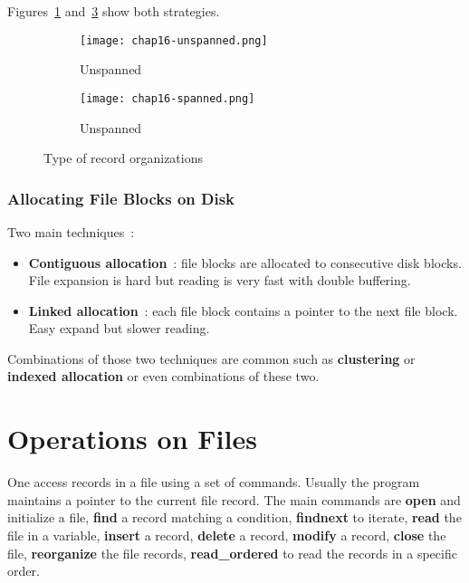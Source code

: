 Figures~\ref{fig:chap16-unspanned} and~\ref{fig:chap16-spanned} show both strategies.

\begin{figure}[h]
    \centering
    \begin{subfigure}[b]{\linewidth}
        \centering
        \texttt{[image: chap16-unspanned.png]}
        \caption{Unspanned}
        \label{fig:chap16-unspanned}
    \end{subfigure}
    
    \begin{subfigure}[b]{\linewidth}
        \centering
        \texttt{[image: chap16-spanned.png]}
        \caption{Unspanned}
        \label{fig:chap16-spanned}
    \end{subfigure}
    \caption{Type of record organizations}
\end{figure}


\subsubsection*{Allocating File Blocks on Disk}
Two main techniques~:
\begin{itemize}
    \item \textbf{Contiguous allocation}~: file blocks are allocated to consecutive disk blocks. File expansion is hard but reading is very fast with double buffering.
    \item \textbf{Linked allocation}~: each file block contains a pointer to the next file block. Easy expand but slower reading.
\end{itemize}

Combinations of those two techniques are common such as \textbf{clustering} or \textbf{indexed allocation} or even combinations of these two.

\section{Operations on Files}
One access records in a file using a set of commands. Usually the program maintains a pointer to the current file record. The main commands are \textbf{open} and initialize a file, \textbf{find} a record matching a condition, \textbf{findnext} to iterate, \textbf{read} the file in a variable, \textbf{insert} a record, \textbf{delete} a record, \textbf{modify} a record, \textbf{close} the file, \textbf{reorganize} the file records, \textbf{read\_ordered} to read the records in a specific order.

